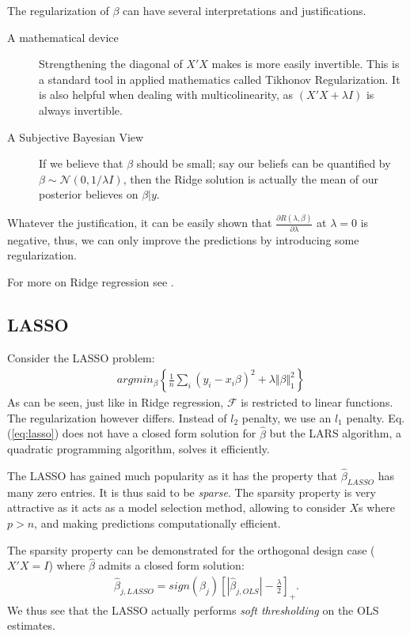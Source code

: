 \documentclass[12pt,a4paper]{article}
\theoremstyle{plain}
\theoremstyle{definition}
\newcommand{\gauss}[1]{\mathcal{N}\left(#1\right)}
\newcommand{\norm}[1]{\Vert #1 \Vert}
\newcommand{\risk}{R}
\newcommand{\deriv}[2]{\frac{\partial #1}{\partial #2}}
\newcommand{\argmin}[2]{argmin_{#1}\left\{ #2 \right\}}
\newcommand{\hypclass}{\mathcal{F}}
\begin{document}
The regularization of $\beta$ can have several interpretations and justifications.
\begin{description}
\item[A mathematical device] Strengthening the diagonal of $X'X$ makes is more easily invertible. This is a standard tool in applied mathematics called Tikhonov Regularization. It is also helpful when dealing with multicolinearity, as $(X'X+\lambda I)$ is always invertible.
\item[A Subjective Bayesian View] If we believe that $\beta$ should be small; say our beliefs can be quantified by $\beta \sim \gauss{0,1/\lambda I}$, then the Ridge solution is actually the mean of our posterior believes on $\beta|y$.
\end{description}

Whatever the justification, it can be easily shown that $\deriv{\risk(\lambda,\beta)}{\lambda}$ at $\lambda=0$ is negative, thus, we can only improve the predictions by introducing some regularization.


For more on Ridge regression see \cite{hastie_elements_2003}.


\subsection{LASSO}
\label{sec:lasso}

Consider the LASSO problem:
\begin{align}
\label{eq:lasso}
	& \argmin{\beta}{\frac{1}{n}\sum_i (y_i-x_i\beta)^2 + \lambda \norm{\beta}^2_1} 
\end{align}
As can be seen, just like in Ridge regression, $\hypclass$ is restricted to linear functions. The regularization however differs. Instead of $l_2$ penalty, we use an $l_1$ penalty.
Eq.(\ref{eq:lasso}) does not have a closed form solution for $\hat{\beta}$ but the LARS algorithm, a quadratic programming algorithm, solves it efficiently.



The LASSO has gained much popularity as it has the property that $\hat{\beta}_{LASSO}$ has many zero entries. It is thus said to be \emph{sparse}.
The sparsity property is very attractive as it acts as a model selection method, allowing to consider $X$s where $p>n$, and making predictions computationally efficient.

The sparsity property can be demonstrated for the orthogonal design case ($X'X=I$) where $\hat{\beta}$ admits a closed form solution:
\begin{align}
	\hat{\beta}_{j,LASSO} = sign(\beta_j) \left[|\hat{\beta}_{j,OLS}|-\frac{\lambda}{2} \right]_+.
\end{align}
We thus see that the LASSO actually performs \emph{soft thresholding} on the OLS estimates. 
\end{document}
